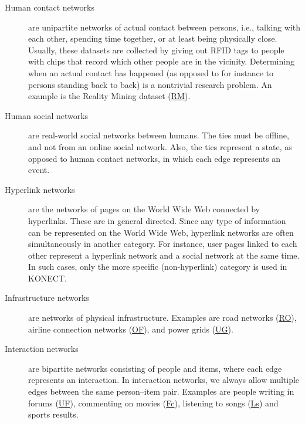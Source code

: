 \documentclass{article}
\begin{document}
\begin{description}
\item[Human contact networks] are unipartite networks of actual contact
  between persons, i.e., talking with each other, spending time
  together, or at least being physically close.  Usually, these datasets
  are collected by giving out RFID tags to people with chips that record
  which other people are in the vicinity.  Determining when an actual
  contact has happened (as opposed to for instance to persons standing
  back to back) is a nontrivial research problem. 
  An example is the Reality Mining dataset
  (\href{http://konect.uni-koblenz.de/networks/mit}{\textsf{RM}}). 

\item[Human social networks] are real-world social networks between
  humans.  
  The ties must be offline, and not from an online social network.
  Also, the ties represent a state, as opposed to human contact
  networks, in which each edge represents an event. 

\item[Hyperlink networks] are the networks 
  of pages on the World Wide Web connected by
  hyperlinks.  These are in general directed.  Since any type of
  information can be represented on the World Wide Web, hyperlink
  networks are often simultaneously in another category.  For instance,
  user pages linked to each other represent a hyperlink network and 
  a social network at the same time.  In such cases, only the more
  specific (non-hyperlink) category is used in KONECT. 

\item[Infrastructure networks] are networks of physical infrastructure.  
  Examples are road networks
  (\href{http://konect.uni-koblenz.de/networks/roadNet-CA}{RO}), airline
  connection networks
  (\href{http://konect.uni-koblenz.de/networks/opsahl-openflights}{OF}), 
  and power grids
  (\href{http://konect.uni-koblenz.de/networks/opsahl-powergrid}{UG}).  
  
\item[Interaction networks] are bipartite networks consisting of people
  and items, where each edge represents an interaction. 
  In interaction networks, we always allow multiple edges between the
  same person--item pair.
  Examples are
  people writing in forums
  (\href{http://konect.uni-koblenz.de/networks/opsahl-ucforum}{\textsf{UF}}),
  commenting on movies
  (\href{http://konect.uni-koblenz.de/networks/filmtipset_comment}{\textsf{Fc}}),
  listening to songs
  (\href{http://konect.uni-koblenz.de/networks/lastfm_song}{\textsf{Ls}})
  and sports results. 


\end{description}
\end{document}
